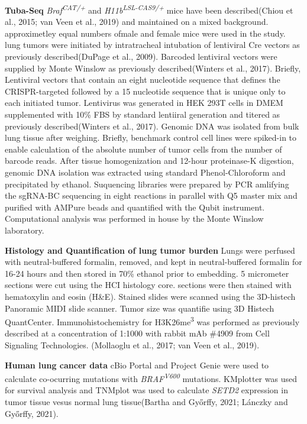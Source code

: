 \textbf{Tuba-Seq} \emph{Braf\textsuperscript{CAT/+}} and \emph{H11b\textsuperscript{LSL-CAS9/+}} mice have been described(Chiou et al., 2015; van Veen et al., 2019) and maintained on a mixed background. approximetley equal numbers ofmale and female mice were used in the study. lung tumors were initiated by intratracheal intubation of lentiviral Cre vectors as previously described(DuPage et al., 2009). Barcoded lentiviral vectors were supplied by Monte Winslow as previously described(Winters et al., 2017). Briefly, Lentiviral vectors that contain an eight nucleotide sequence that defines the CRISPR-targeted followed by a 15 nucleotide sequence that is unique only to each initiated tumor. Lentivirus was generated in HEK 293T cells in DMEM supplemented with 10\% FBS by standard lentiiral generation and titered as previously described(Winters et al., 2017). Genomic DNA was isolated from bulk lung tissue after weighing. Briefly, benchmark control cell lines were spiked-in to enable calculation of the absolute number of tumor cells from the number of barcode reads. After tissue homogenization and 12-hour proteinase-K digestion, genomic DNA isolation was extracted using standard Phenol-Chloroform and precipitated by ethanol. Suquencing libraries were prepared by PCR amlifying the sgRNA-BC sequencing in eight reactions in parallel with Q5 master mix and purified with AMPure beads and quantified with the Qubit instrument. Computational analysis was performed in house by the Monte Winslow laboratory.

\textbf{Histology and Quantification of lung tumor burden}
Lungs were perfused with neutral-buffered formalin, removed, and kept in neutral-buffered formalin for 16-24 hours and then stored in 70\% ethanol prior to embedding. 5 micrometer sections were cut using the HCI histology core. sections were then stained with hematoxylin and eosin (H\&E). Stained slides were scanned using the 3D-histech Panoramic MIDI slide scanner. Tumor size was quantifie using 3D Histech QuantCenter. Immunohistochemistry for H3K26me\textsuperscript{3} was performed as previously described at a concentration of 1:1000 with rabbit mAb \#4909 from Cell Signaling Technologies. (Mollaoglu et al., 2017; van Veen et al., 2019).

\textbf{Human lung cancer data} cBio Portal and Project Genie were used to calculate co-ocurring mutations with \emph{BRAF\textsuperscript{V600}} mutations. KMplotter was used for survival analysis and TNMplot was used to calculate \emph{SETD2} expression in tumor tissue vesus normal lung tissue(Bartha and Győrffy, 2021; Lánczky and Győrffy, 2021).

